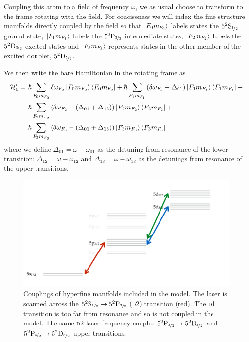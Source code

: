     Coupling this atom to a field of frequency $\omega$, we as usual choose to
    transform to the frame rotating with the field. For conciseness we will
    index the fine structure manifolds directly coupled by the field so that
    $\Ket{F_0 m_{F_0}}$ labels states the $5^2\rm{S}_{\nicefrac{1}{2}}$ ground
    state, $\Ket{F_1 m_{F_1}}$ labels the $5^2\rm{P}_{\nicefrac{3}{2}}$
    intermediate states, $\Ket{F_2 m_{F_2}}$ labels the
    $5^2\rm{D}_{\nicefrac{3}{2}}$ excited states and $\Ket{F_3 m_{F_3}}$
    represents states in the other member of the excited doublet,
    $5^2\rm{D}_{\nicefrac{5}{2}}$.

    We then write the bare Hamiltonian in the rotating frame as 
    \begin{align}
      \mathcal{H}_0' =~ 
        & \hbar \sum_{F_0 m_{F_0}} \delta \omega_{F_0} 
        \Ket{F_0 m_{F_0}} \Bra{F_0 m_{F_0}} + 
        \hbar \sum_{F_1 m_{F_1}} \left( \delta \omega_{F_1} - 
            \Delta_{01} \right)
        \Ket{F_1 m_{F_1}} \Bra{F_1 m_{F_1}} + \nonumber \\
        & \hbar \sum_{F_2 m_{F_2}} \left( \delta \omega_{F_2} - 
            (\Delta_{01} + \Delta_{12})
        \right) \Ket{F_2 m_{F_2}} \Bra{F_2 m_{F_2}} + \nonumber \\
        & \hbar \sum_{F_3 m_{F_3}} \left( \delta \omega_{F_3} - 
            (\Delta_{01} + \Delta_{13})
        \right) \Ket{F_3 m_{F_3}} \Bra{F_3 m_{F_3}}
    \end{align}
    where we define $\Delta_{01} = \omega - \omega_{01}$ as the detuning from
    resonance of the lower transition; $\Delta_{12} = \omega - \omega_{12}$ and
    $\Delta_{13} = \omega - \omega_{13}$ as the detunings from resonance of the
    upper transitions.

    \begin{figure}[]
    \includegraphics[width=\linewidth]
        {figs/05_twophoton/twophoton_level_scheme_coupling.pdf}
    \caption{
    Couplings of hyperfine manifolds included in the model. The laser is scanned
    across the $5^2\rm{S}_{\nicefrac{1}{2}} \rightarrow
    5^2\rm{P}_{\nicefrac{3}{2}}$ (\textsc{d2}) transition (red). The \textsc{d1}
    transition is too far from resonance and so is not coupled in the model. The
    same \textsc{d2} laser frequency couples $5^2\rm{P}_{\nicefrac{3}{2}}
    \rightarrow 5^2\rm{D_{\nicefrac{3}{2}}}$ and $5^2\rm{P}_{\nicefrac{3}{2}}
    \rightarrow 5^2\rm{D_{\nicefrac{3}{2}}}$ upper transitions.
    } 
    \label{fig:twophoton_level_scheme_coupling} 
    \end{figure}

